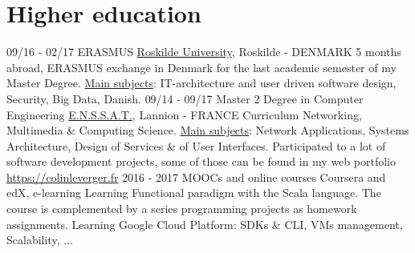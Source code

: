 \documentclass[]{friggeri-cv}
\begin{document}

\section{Higher education}
\begin{entrylist}
  \entry
    {09/16 - 02/17}
    {ERASMUS}
    {\href{http://www.ruc.dk/en/}{Roskilde University}, Roskilde - DENMARK}
    {5 months abroad, ERASMUS exchange in Denmark for the last academic semester of my Master Degree. \underline{Main subjects}: IT-architecture and user driven software design, Security, Big Data, Danish.}
  \entry
    {09/14 - 09/17}
    {Master 2 Degree in Computer Engineering}
    {\href{http://www.enssat.fr}{E.N.S.S.A.T.}, Lannion - FRANCE}
    {Curriculum Networking, Multimedia \& Computing Science. \underline{Main subjects}: Network Applications, Systems Architecture, Design of Services \& of User Interfaces. Participated to a lot of software development projects, some of those can be found in my web portfolio \href{https://colinleverger.fr}{https://colinleverger.fr}}
\vspace{-1.2em}  
  \entry
    {2016  -  2017}
    {MOOCs and online courses}
    {Coursera and edX, e-learning}
    {Learning Functional paradigm with the Scala language. The course is complemented by a series programming projects as homework assignments. Learning Google Cloud Platform: SDKs \& CLI, VMs management, Scalability, ...}
\end{entrylist}
\end{document}
